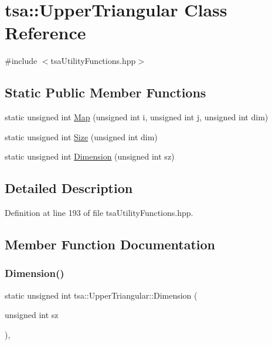 \hypertarget{classtsa_1_1_upper_triangular}{}\section{tsa\+:\+:Upper\+Triangular Class Reference}
\label{classtsa_1_1_upper_triangular}


{\ttfamily \#include $<$tsa\+Utility\+Functions.\+hpp$>$}

\subsection*{Static Public Member Functions}
\begin{DoxyCompactItemize}
\item 
static unsigned int \hyperlink{classtsa_1_1_upper_triangular_a5f1438749cd68c2d37bdab3746fdc89a}{Map} (unsigned int i, unsigned int j, unsigned int dim)
\item 
static unsigned int \hyperlink{classtsa_1_1_upper_triangular_ae7dd3b19c6587107501dcdda9276e581}{Size} (unsigned int dim)
\item 
static unsigned int \hyperlink{classtsa_1_1_upper_triangular_a66ef91ddaab559ac8caceae49df911d6}{Dimension} (unsigned int sz)
\end{DoxyCompactItemize}


\subsection{Detailed Description}


Definition at line 193 of file tsa\+Utility\+Functions.\+hpp.



\subsection{Member Function Documentation}
\mbox{\label{classtsa_1_1_upper_triangular_a66ef91ddaab559ac8caceae49df911d6}} 
\subsubsection{\texorpdfstring{Dimension()}{Dimension()}}
{\footnotesize\ttfamily static unsigned int tsa\+::\+Upper\+Triangular\+::\+Dimension (\begin{DoxyParamCaption}\item[{unsigned int}]{sz }\end{DoxyParamCaption})\hspace{0.3cm}{\ttfamily [inline]}, {\ttfamily [static]}}



